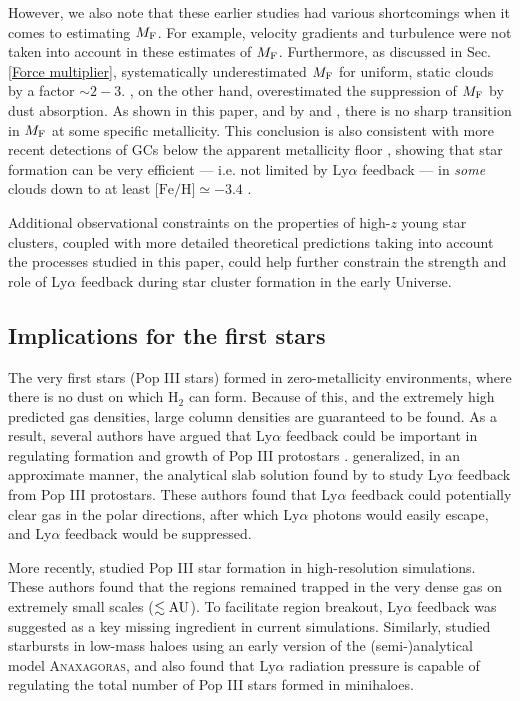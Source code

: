 \documentclass[fleqn,usenatbib]{mnras}
\newcommand\HI{\ion{H}{I}\xspace} %
\newcommand\HII{\ion{H}{II}\xspace} %
\begin{document}
However, we also note that these earlier studies had various shortcomings when it comes to estimating $M_{\rm F}$. For example, velocity gradients and turbulence were not taken into account in these estimates of $M_{\rm F}$. Furthermore, as discussed in Sec. \ref{Force multiplier}, \cite{Kimm2018} systematically underestimated $M_{\rm F}$ for uniform, static clouds by a factor $\sim 2-3$. \cite{Abe2018}, on the other hand, overestimated the suppression of $M_{\rm F}$ by dust absorption. As shown in this paper, and by \cite{Kimm2018} and \cite{Tomaselli2021}, there is no sharp transition in $M_{\rm F}$ at some specific metallicity. This conclusion is also consistent with more recent detections of GCs below the apparent metallicity floor \citep{Larsen2020, Martin2022, Weisz2023}, showing that star formation can be very efficient --- i.e. not limited by Ly$\alpha$ feedback --- in \textit{some} clouds down to at least $\textrm{[Fe/H]} \simeq -3.4$ \citep{Martin2022}. 

Additional observational constraints on the properties of high-$z$ young star clusters, coupled with more detailed theoretical predictions taking into account the processes studied in this paper, could help further constrain the strength and role of Ly$\alpha$ feedback during star cluster formation in the early Universe. 


\subsection{Implications for the first stars}
\label{First stars implications}

The very first stars (Pop III stars) formed in zero-metallicity environments, where there is no dust on which H$_2$ can form. Because of this, and the extremely high predicted gas densities, large \HI column densities are guaranteed to be found. As a result, several authors have argued that Ly$\alpha$ feedback could be important in regulating formation and growth of Pop III protostars \citep{Doroshkevich1976, McKee2008, Jaura2022, Nebrin2022}. \cite{McKee2008} generalized, in an approximate manner, the analytical slab solution found by \cite{Neufeld1990} to study Ly$\alpha$ feedback from Pop III protostars. These authors found that Ly$\alpha$ feedback could potentially clear gas in the polar directions, after which Ly$\alpha$ photons would easily escape, and Ly$\alpha$ feedback would be suppressed. 

More recently, \cite{Jaura2022} studied Pop III star formation in high-resolution simulations. These authors found that the \HII regions remained trapped in the very dense gas on extremely small scales ($\lesssim \rm AU$). To facilitate \HII region breakout, Ly$\alpha$ feedback was suggested as a key missing ingredient in current simulations. Similarly, \cite{Nebrin2022} studied starbursts in low-mass haloes using an early version of the (semi-)analytical model \textsc{Anaxagoras}, and also found that Ly$\alpha$ radiation pressure is capable of regulating the total number of Pop III stars formed in minihaloes. 
\end{document}
